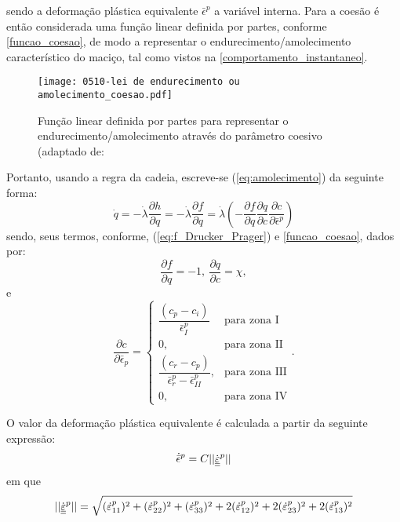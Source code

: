 sendo a deformação plástica equivalente $\bar \epsilon^p$ a variável interna. Para a coesão é então considerada uma função linear definida por partes, conforme \autoref{funcao_coesao}, de modo a representar o endurecimento/amolecimento característico do maciço, tal como vistos na \autoref{comportamento_instantaneo}.
\begin{figure}[H]
	\begin{center}
		\texttt{[image: 0510-lei de endurecimento ou amolecimento\_coesao.pdf]}
	\end{center}
	\caption{\label{funcao_coesao}Função linear definida por partes para representar o endurecimento/amolecimento através do parâmetro coesivo (adaptado de: }
\end{figure}
Portanto, usando a regra da cadeia, escreve-se (\ref{eq:amolecimento}) da seguinte forma:
\begin{equation}
	\label{eq:expressao_amolecimento}
	\dot q = - \dot \lambda \dfrac{\partial h}{\partial q} = - \dot \lambda \dfrac{\partial f}{\partial q} = \dot \lambda \left(- \dfrac{\partial f}{\partial q}\dfrac{\partial q}{\partial c}\dfrac{\partial c}{\partial \bar \epsilon^p}\right)	
\end{equation}
sendo, seus termos, conforme, (\ref{eq:f_Drucker_Prager}) e \autoref{funcao_coesao}, dados por:
\begin{equation}
	\label{eq:dfdq}
	\dfrac{\partial f}{\partial q} = -1,~\dfrac{\partial q}{\partial c} = \chi,
\end{equation}
e
\begin{equation}
	\label{eq:dqde}
	\dfrac{\partial c}{\partial \bar \epsilon_{p}} = \left\{ \begin{array}{ll} \dfrac{(c_p-c_i)}{\bar \epsilon^p_I} &  \text{para zona I} \\ 
	0, & \text{para zona II} \\
	\dfrac{(c_r-c_p)}{\bar \epsilon^p_{r}-\bar \epsilon^p_{II}}, & \text{para zona III} \\	
	0, & \text{para zona IV}
\end{array}\right..
\end{equation}

O valor da deformação plástica equivalente é calculada a partir da seguinte expressão:
\begin{equation}
	\label{eq:epsPeq}
	\dot{{\bar \epsilon}}^p = C||\dot {\underline{\underline \varepsilon}}^p||
\end{equation}
em que
\begin{equation}
	\label{eq:epsPeq}
	||\dot {\underline{\underline \varepsilon}}^p|| = \sqrt{(\dot{\varepsilon}^{p}_{11})^2 + (\dot{\varepsilon}^{p}_{22})^2 + (\dot{\varepsilon}^{p}_{33})^2 + 2(\dot{\varepsilon}^{p}_{12})^2 + 2(\dot{\varepsilon}^{p}_{23})^2 + 2(\dot{\varepsilon}^{p}_{13})^2}
\end{equation}

